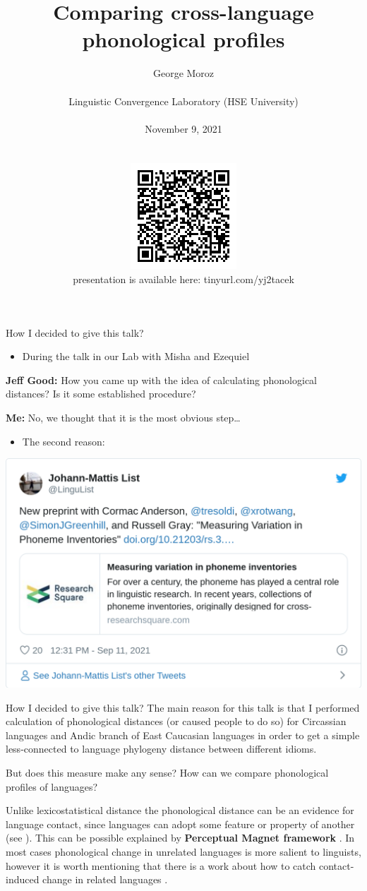 \documentclass[
  ignorenonframetext,
]{beamer}
\title{Comparing cross-language phonological profiles}
\author{George Moroz\\
~\\
\small Linguistic Convergence Laboratory (HSE University)\\
~\\
November 9, 2021\\
~\\
~\\
\includegraphics{images/00_qrcode.png}\\
presentation is available here: tinyurl.com/yj2tacek}
\date{}
\providecommand{\tightlist}{%
  \setlength{\itemsep}{0pt}\setlength{\parskip}{0pt}}
\begin{document}
\frame{\titlepage}

\begin{frame}{How I decided to give this talk?}
\protect\hypertarget{how-i-decided-to-give-this-talk}{}
\begin{itemize}
\tightlist
\item
  During the talk in our Lab with Misha and Ezequiel
\end{itemize}

\textbf{Jeff Good:} How you came up with the idea of calculating
phonological distances? Is it some established procedure?

\textbf{Me:} No, we thought that it is the most obvious step\ldots{}
\pause

\begin{itemize}
\tightlist
\item
  The second reason:
\end{itemize}

\includegraphics{2021.11.09_comparing_phonological_profiles_files/figure-beamer/list-1.png}
\end{frame}

\begin{frame}{How I decided to give this talk?}
\protect\hypertarget{how-i-decided-to-give-this-talk-1}{}
The main reason for this talk is that I performed calculation of
phonological distances (or caused people to do so) for Circassian
languages \citep{moroz21} and Andic branch of East Caucasian languages
\citep{moroz20, davidenko21, tsyzova21} in order to get a simple
less-connected to language phylogeny distance between different idioms.
\pause

But does this measure make any sense? How can we compare phonological
profiles of languages? \pause

Unlike lexicostatistical distance the phonological distance can be an
evidence for language contact, since languages can adopt some feature or
property of another (see \citep{andersson17}). This can be possible
explained by \textbf{Perceptual Magnet framework} \citep{blevins17}. In
most cases phonological change in unrelated languages is more salient to
linguists, however it is worth mentioning that there is a work about how
to catch contact-induced change in related languages \citep{bowern13}.
\end{frame}
\end{document}
